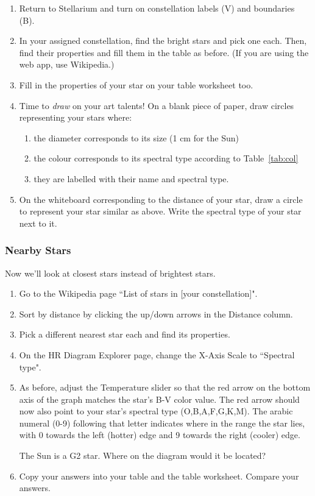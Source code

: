 \documentclass[main.tex]{subfiles}
\begin{document}
\begin{enumerate}
\item Return to Stellarium and turn on constellation labels (V) and boundaries (B).
\item In your assigned constellation, find the bright stars and pick one each. Then, find their properties and fill them in the table as before. (If you are using the web app, use Wikipedia.)
\item Fill in the properties of your star on your table worksheet too.
\item Time to \emph{draw} on your art talents! On a blank piece of paper, draw circles representing your stars where:
	\begin{enumerate}
	\item the diameter corresponds to its size (1 cm for the Sun)
	\item the colour corresponds to its spectral type according to Table~\ref{tab:col}
	\item they are labelled with their name and spectral type.
	\end{enumerate}
\item On the whiteboard corresponding to the distance of your star, draw a circle to represent your star similar as above. Write the spectral type of your star next to it.
\end{enumerate}

\subsubsection{Nearby Stars}
Now we'll look at closest stars instead of brightest stars.
\begin{enumerate}
\item Go to the Wikipedia page ``List of stars in [your constellation]".
\item Sort by distance by clicking the up/down arrows in the Distance column.
\item Pick a different nearest star each and find its properties.
\item On the HR Diagram Explorer page, change the X-Axis Scale to ``Spectral type".
\item As before, adjust the Temperature slider so that the red arrow on the bottom axis of the graph matches the star's B-V color value. The red arrow should now also point to your star's spectral type (O,B,A,F,G,K,M). The arabic numeral (0-9) following that letter indicates where in the range the star lies, with 0 towards the left (hotter) edge and 9 towards the right (cooler) edge.

The Sun is a G2 star. Where on the diagram would it be located?
\item Copy your answers into your table and the table worksheet. Compare your answers.
\end{enumerate}
\end{document}
